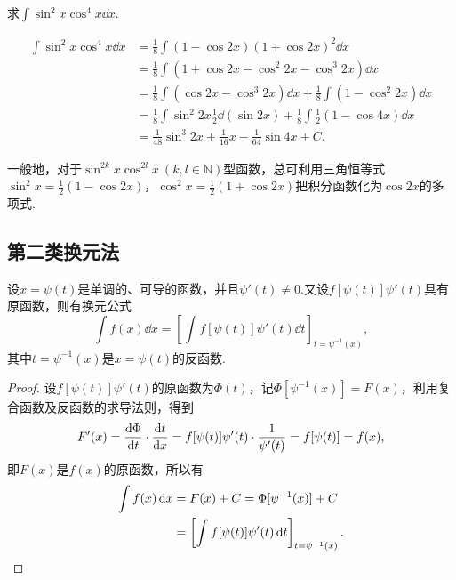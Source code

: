 \begin{example}
求\(\int \sin^2 x \cos^4 x \dd{x}\).
\begin{solution}
\begin{align*}
\int \sin^2 x \cos^4 x \dd{x}
&= \frac{1}{8} \int (1 - \cos 2x) (1 + \cos 2x)^2 \dd{x} \\
&= \frac{1}{8} \int (1 + \cos 2x - \cos^2 2x - \cos^3 2x) \dd{x} \\
&= \frac{1}{8} \int (\cos 2x - \cos^3 2x) \dd{x}
	+ \frac{1}{8} \int (1 - \cos^2 2x) \dd{x} \\
&= \frac{1}{8} \int \sin^2 2x \frac{1}{2} \dd(\sin 2x)
	+ \frac{1}{8} \int \frac{1}{2} (1 - \cos 4x) \dd{x} \\
&= \frac{1}{48} \sin^3 2x + \frac{1}{16} x - \frac{1}{64} \sin 4x + C.
\end{align*}
\end{solution}
\end{example}

一般地，对于\(\sin^{2k} x \cos^{2l} x\ (k,l\in\mathbb{N})\)型函数，总可利用三角恒等式\(\sin^2 x = \frac{1}{2} (1 - \cos 2x)\)，\(\cos^2 x = \frac{1}{2} (1 + \cos 2x)\)把积分函数化为\(\cos 2x\)的多项式.

\subsection{第二类换元法}

\begin{theorem}
设\(x = \psi(t)\)是单调的、可导的函数，并且\(\psi'(t) \neq 0\).又设\(f[\psi(t)] \psi'(t)\)具有原函数，则有换元公式\[
\int f(x) \dd{x} = \left[ \int f[\psi(t)] \psi'(t) \dd{t} \right]_{t=\psi^{-1}(x)},
\]其中\(t=\psi^{-1}(x)\)是\(x=\psi(t)\)的反函数.
\begin{proof}
设\(f[\psi(t)] \psi'(t)\)的原函数为\(\Phi(t)\)，记\(\Phi[\psi^{-1}(x)] = F(x)\)，利用复合函数及反函数的求导法则，得到\[
F'(x) = \dv{\Phi}{t} \cdot \dv{t}{x}
= f[\psi(t)] \psi'(t) \cdot \frac{1}{\psi'(t)}
= f[\psi(t)] = f(x),
\]即\(F(x)\)是\(f(x)\)的原函数，所以有\begin{align*}
\int f(x) \dd{x} &= F(x) + C
= \Phi[\psi^{-1}(x)] + C \\
&= \left[ \int f[\psi(t)] \psi'(t) \dd{t} \right]_{t=\psi^{-1}(x)}.
\qedhere
\end{align*}
\end{proof}
\end{theorem}

